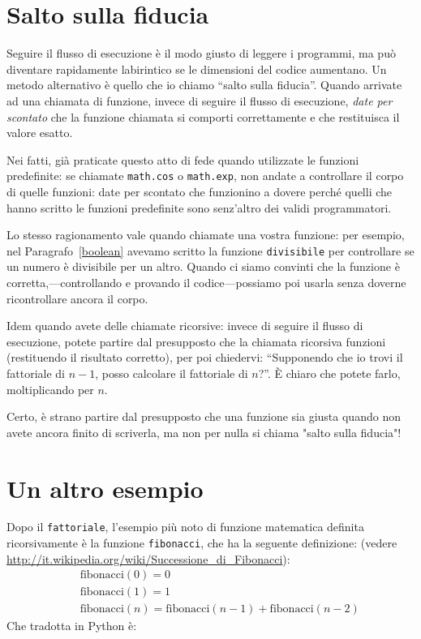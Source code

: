 \documentclass[10pt]{book}
\begin{document}
\section{Salto sulla fiducia}

Seguire il flusso di esecuzione è il modo giusto di leggere i programmi, ma
può diventare rapidamente labirintico se le dimensioni del codice aumentano. Un metodo alternativo è quello che io chiamo ``salto sulla fiducia''.  Quando arrivate ad una chiamata di funzione, invece di seguire il flusso di esecuzione, {\em date per scontato} che la funzione chiamata si comporti correttamente e che restituisca il valore esatto.

Nei fatti, già praticate questo atto di fede quando utilizzate le funzioni predefinite: se chiamate {\tt math.cos} o {\tt math.exp}, non andate a controllare il corpo di quelle funzioni: date per scontato che funzionino a dovere perché quelli che hanno scritto le funzioni predefinite sono senz'altro dei validi programmatori.

Lo stesso ragionamento vale quando chiamate una vostra funzione: per esempio, nel Paragrafo~\ref{boolean} avevamo scritto la funzione \verb"divisibile" per controllare se un numero è divisibile per un altro. Quando ci siamo convinti che la funzione è corretta,---controllando e provando il codice---possiamo poi usarla senza doverne ricontrollare ancora il corpo.

Idem quando avete delle chiamate ricorsive: invece di seguire il flusso di esecuzione, potete partire dal presupposto che la chiamata ricorsiva funzioni
(restituendo il risultato corretto), per poi chiedervi: ``Supponendo che io trovi il fattoriale di $n-1$, posso calcolare il fattoriale di $n$?''. È chiaro che potete farlo, moltiplicando per $n$.

Certo, è strano partire dal presupposto che una funzione sia giusta quando non avete ancora finito di scriverla, ma non per nulla si chiama "salto sulla fiducia"!


\section{Un altro esempio}
\label{one.more.example}

Dopo il {\tt fattoriale}, l'esempio più noto di funzione matematica definita ricorsivamente è la funzione {\tt fibonacci}, che ha la seguente definizione: (vedere \url{http://it.wikipedia.org/wiki/Successione_di_Fibonacci}):
%
\begin{eqnarray*}
&& \mathrm{fibonacci}(0) = 0 \\
&& \mathrm{fibonacci}(1) = 1 \\
&& \mathrm{fibonacci}(n) = \mathrm{fibonacci}(n-1) + \mathrm{fibonacci}(n-2)
\end{eqnarray*}
%
Che tradotta in Python è:
\end{document}
